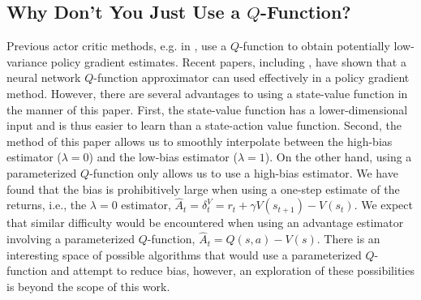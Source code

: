 \documentclass{article}
\newcommand{\dv}{\delta^V}
\newcommand{\hata}{\hat{A}}
\begin{document}
\subsection{Why Don't You Just Use a $Q$-Function?}
Previous actor critic methods, e.g. in \cite{konda2003onactor}, use a $Q$-function to obtain potentially low-variance policy gradient estimates.
Recent papers, including \cite{heess2015learning,lillicrap2015continuous}, have shown that a neural network $Q$-function approximator can used effectively in a policy gradient method.
However, there are several advantages to using a state-value function in the manner of this paper.
First, the state-value function has a lower-dimensional input and is thus easier to learn than a state-action value function.
Second, the method of this paper allows us to smoothly interpolate between the high-bias estimator ($\lambda=0$) and the low-bias estimator ($\lambda=1$).
On the other hand, using a parameterized $Q$-function only allows us to use a high-bias estimator.
We have found that the bias is prohibitively large when using a one-step estimate of the returns, i.e., the $\lambda=0$ estimator, $\hata_t = \dv_t = r_t + \gamma V(s_{t+1}) - V(s_t)$.
We expect that similar difficulty would be encountered when using an advantage estimator involving a parameterized $Q$-function, $\hata_t = Q(s,a) - V(s)$.
There is an interesting space of possible algorithms that would use a parameterized $Q$-function and attempt to reduce bias, however, an exploration of these possibilities is beyond the scope of this work.
\end{document}
